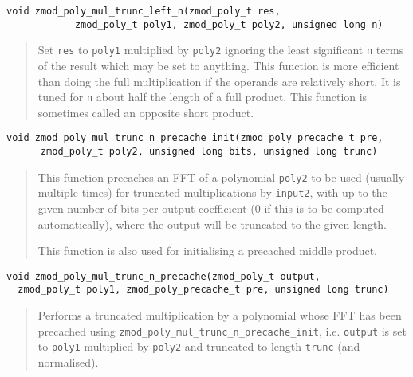 \documentclass[a4paper,10pt]{article}
\newcommand{\code}{\lstinline}
\begin{document}
\begin{lstlisting}
void zmod_poly_mul_trunc_left_n(zmod_poly_t res, 
            zmod_poly_t poly1, zmod_poly_t poly2, unsigned long n)
\end{lstlisting}
\begin{quote}
Set \code{res} to \code{poly1} multiplied by \code{poly2} ignoring the least significant \code{n} terms of the result which may be set to anything. This function is more efficient than doing the full multiplication if the operands are relatively short. It is tuned for \code{n} about half the length of a full product. This function is sometimes called an opposite short product. 
\end{quote}

\begin{lstlisting}
void zmod_poly_mul_trunc_n_precache_init(zmod_poly_precache_t pre,
      zmod_poly_t poly2, unsigned long bits, unsigned long trunc)
\end{lstlisting}
\begin{quote}
This function precaches an FFT of a polynomial \code{poly2} to be used (usually multiple times) for truncated multiplications by \code{input2}, with up to the given number of bits per output coefficient (0 if this is to be computed automatically), where the output will be truncated to the given length.  

This function is also used for initialising a precached middle product. 
\end{quote}

\begin{lstlisting}
void zmod_poly_mul_trunc_n_precache(zmod_poly_t output,
  zmod_poly_t poly1, zmod_poly_precache_t pre, unsigned long trunc)
\end{lstlisting}
\begin{quote}
Performs a truncated multiplication by a polynomial whose FFT has been precached using \code{zmod_poly_mul_trunc_n_precache_init}, i.e. \code{output} is set to \code{poly1} multiplied by \code{poly2} and truncated to length \code{trunc} (and normalised). 
\end{quote}
\end{document}
